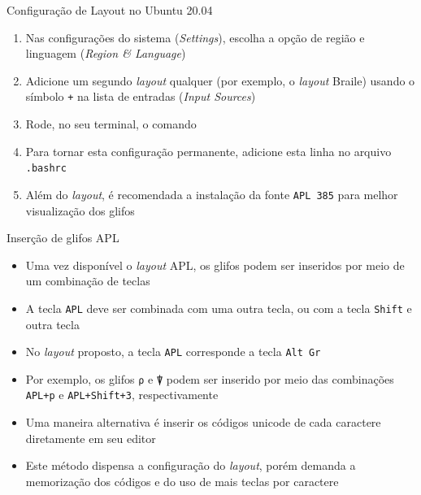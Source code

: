 \begin{frame}[fragile]{Configuração de Layout no Ubuntu 20.04}

    \begin{enumerate}
        \item Nas configurações do sistema (\textit{Settings}), escolha a opção de região e
            linguagem (\textit{Region \& Language})
        \pause

        \item Adicione um segundo \textit{layout} qualquer (por exemplo, o \textit{layout} Braile)
            usando o símbolo \texttt{+} na lista de entradas (\textit{Input Sources})
        \pause

        \item Rode, no seu terminal, o comando

        \pause

        \item Para tornar esta configuração permanente, adicione esta linha no arquivo
            \texttt{.bashrc}
        \pause

        \item Além do \textit{layout}, é recomendada a instalação da fonte \texttt{APL 385} para
            melhor visualização dos glifos
    \end{enumerate}
\end{frame}

\begin{frame}[fragile]{Inserção de glifos APL}

    \begin{itemize}
        \item Uma vez disponível o \textit{layout} APL, os glifos podem ser inseridos por meio
            de um combinação de teclas
        \pause

        \item A tecla \texttt{APL} deve ser combinada com uma outra tecla, ou com a tecla
            \texttt{Shift} e outra tecla
        \pause

        \item No \textit{layout} proposto, a tecla \texttt{APL} corresponde a tecla
            \texttt{Alt Gr}
        \pause

        \item Por exemplo, os glifos \texttt{⍴} e \texttt{⍒} podem ser inserido por meio das combinações
            \texttt{APL+p} e \texttt{APL+Shift+3}, respectivamente

        \pause

        \item Uma maneira alternativa é inserir os códigos unicode de cada caractere diretamente
            em seu editor

        \pause

        \item Este método dispensa a configuração do \textit{layout}, porém demanda a memorização
            dos códigos e do uso de mais teclas por caractere
    \end{itemize}

\end{frame}

